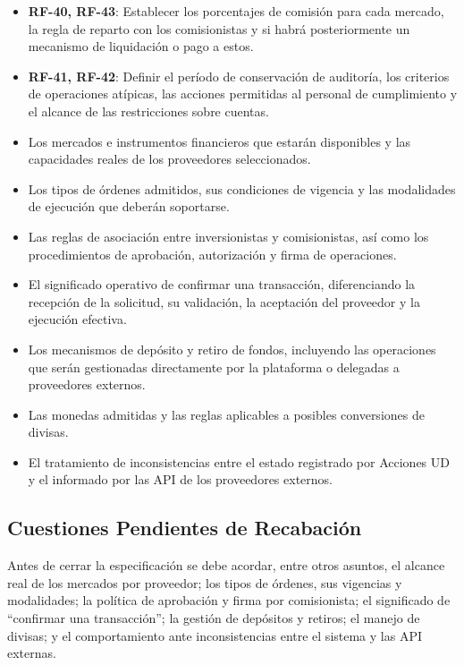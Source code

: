 \documentclass[11pt,a4paper,oneside]{article}
\begin{document}
\begin{itemize}
    \item \textbf{RF-40, RF-43}: Establecer los porcentajes de comisión para cada mercado, la regla de reparto con los comisionistas y si habrá posteriormente un mecanismo de liquidación o pago a estos.

    \item \textbf{RF-41, RF-42}: Definir el período de conservación de auditoría, los criterios de operaciones atípicas, las acciones permitidas al personal de cumplimiento y el alcance de las restricciones sobre cuentas.

    \item Los mercados e instrumentos financieros que estarán
    disponibles y las capacidades reales de los proveedores
    seleccionados.

    \item Los tipos de órdenes admitidos, sus condiciones de
    vigencia y las modalidades de ejecución que deberán soportarse.

    \item Las reglas de asociación entre inversionistas y
    comisionistas, así como los procedimientos de aprobación,
    autorización y firma de operaciones.

    \item El significado operativo de confirmar una transacción,
    diferenciando la recepción de la solicitud, su validación,
    la aceptación del proveedor y la ejecución efectiva.

    \item Los mecanismos de depósito y retiro de fondos,
    incluyendo las operaciones que serán gestionadas directamente
    por la plataforma o delegadas a proveedores externos.

    \item Las monedas admitidas y las reglas aplicables
    a posibles conversiones de divisas.

    \item El tratamiento de inconsistencias entre el estado
    registrado por Acciones UD y el informado por las API
    de los proveedores externos.

\end{itemize}

\subsection{Cuestiones Pendientes de Recabación}
Antes de cerrar la especificación se debe acordar, entre otros asuntos, el alcance real de los mercados por proveedor; los tipos de órdenes, sus vigencias y modalidades; la política de aprobación y firma por comisionista; el significado de ``confirmar una transacción''; la gestión de depósitos y retiros; el manejo de divisas; y el comportamiento ante inconsistencias entre el sistema y las API externas.
\end{document}
